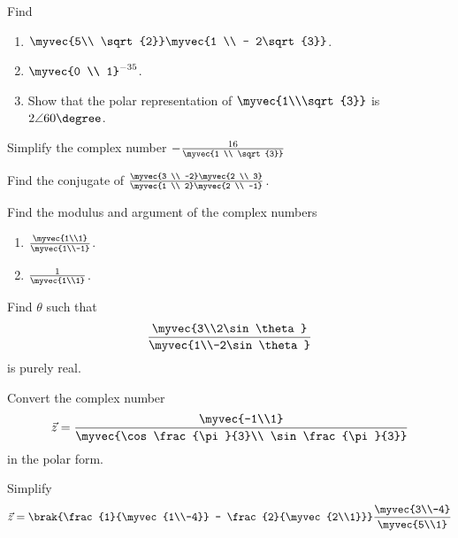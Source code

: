 \item Find 
\begin{enumerate}
\item $\myvec{5\\ \sqrt{2}} \myvec{1 \\ - 2\sqrt{3}}$.
\item $\myvec{0 \\ 1}^{-35}$.
\item Show that the polar representation of $\myvec{1\\\sqrt{3}}$ is $2\angle 60\degree$.
\end{enumerate}
\item Simplify the complex number $-\frac{16}{\myvec{1 \\ \sqrt{3}}}$
\\
\solution 

\item Find the conjugate of $\frac{\myvec{3 \\ -2}\myvec{2 \\ 3}}{\myvec{1 \\ 2}\myvec{2 \\ -1}}$.
\\
\solution

\item Find the modulus and argument of the complex numbers
\begin{enumerate}
\item $\frac{\myvec{1\\1}}{\myvec{1\\-1}}$.
\item $\frac{1}{\myvec{1\\1}}$.
\end{enumerate}
\solution

\item Find $\theta$ such that 
\begin{align}
\frac{\myvec{3\\2\sin\theta}}{\myvec{1\\-2\sin\theta}}
\end{align}
%
is purely real.
\item Convert the complex number 
\begin{align}
\vec{z} = \frac{\myvec{-1\\1}}{\myvec{\cos \frac{\pi}{3}\\ \sin\frac{\pi}{3}}}
\end{align}
%
in the polar form.
%
\item Simplify 
%
\begin{align}
\vec{z} = \brak{\frac{1}{\myvec{1\\-4}} - \frac{2}{\myvec{2\\1}}}\frac{\myvec{3\\-4}}{\myvec{5\\1}} 
\end{align}
